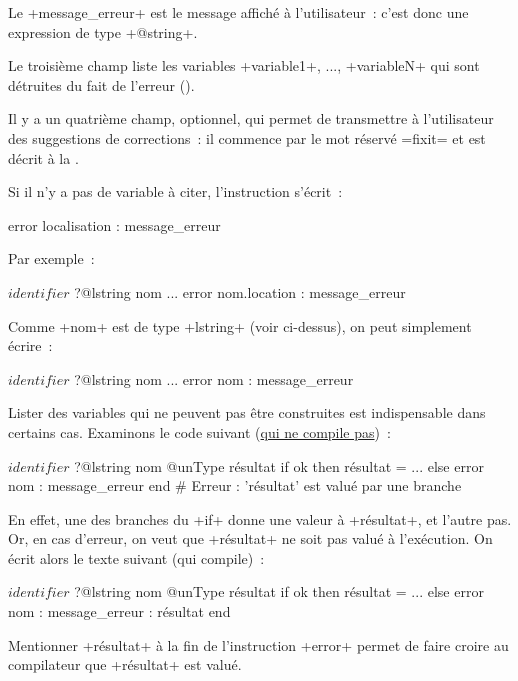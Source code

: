 Le \ggs+message_erreur+ est le message affiché à l'utilisateur~: c'est donc une expression de type \ggs+@string+.

Le troisième champ liste les variables \ggs+variable1+, ..., \ggs+variableN+ qui sont détruites du fait de l'erreur ().

Il y a un quatrième champ, optionnel, qui permet de transmettre à l'utilisateur des suggestions de corrections~: il commence par le mot réservé \ggs=fixit= et est décrit à la .

Si il n'y a pas de variable à citer, l'instruction s'écrit~:
\begin{galgas}
error localisation : message_erreur
\end{galgas}

Par exemple~:

\begin{galgas}
$identifier$ ?@lstring nom
...
error nom.location : message_erreur
\end{galgas}

Comme \ggs+nom+ est de type \ggs+lstring+ (voir ci-dessus), on peut simplement écrire~:
\begin{galgas}
$identifier$ ?@lstring nom
...
error nom : message_erreur
\end{galgas}



Lister des variables qui ne peuvent pas être construites est indispensable dans certains cas. Examinons le code suivant (\underline{qui ne compile pas})~:
\begin{galgas}
$identifier$ ?@lstring nom
@unType résultat
if ok then
  résultat = ...
else
  error nom : message_erreur
end # Erreur : 'résultat' est valué par une branche
\end{galgas}

En effet, une des branches du \ggs+if+ donne une valeur à \ggs+résultat+, et l'autre pas. Or, en cas d'erreur, on veut que \ggs+résultat+ ne soit pas valué à l'exécution. On écrit alors le texte suivant (qui compile)~:
\begin{galgas}
$identifier$ ?@lstring nom
@unType résultat
if ok then
  résultat = ...
else
  error nom : message_erreur : résultat
end
\end{galgas}

Mentionner \ggs+résultat+ à la fin de l'instruction \ggs+error+ permet de faire croire au compilateur que \ggs+résultat+ est valué.


